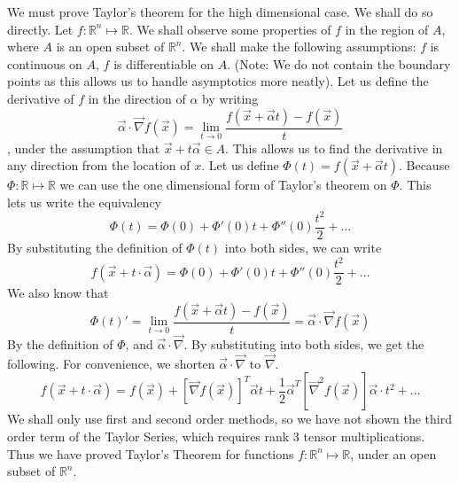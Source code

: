 \documentclass[10pt]{article}
\begin{document}
We must prove Taylor's theorem for the high dimensional case. We shall do so directly.
Let $f : \mathbb{R}^n \mapsto \mathbb{R}$. We shall observe some properties of $f$ in the region of $A$, where $A$ is an open subset of $\mathbb{R}^n$. We shall make the following assumptions: $f$ is continuous on $A$, $f$ is differentiable on $A$. (Note: We do not contain the boundary points as this allows us to handle asymptotics more neatly). 
Let us define the derivative of $f$ in the direction of $\alpha$ by writing \begin{equation}\vec{\alpha} \cdot \vec{\nabla} f(\vec{x}) = \lim_{t \to 0}\frac{f(\vec{x} + \vec{\alpha}t) - f(\vec{x})}{t}\end{equation}, under the assumption that $\vec{x} + t \vec{\alpha} \in A$. This allows us to find the derivative in any direction from the location of $x$. Let us define $\Phi(t) = f(\vec{x} + \vec{\alpha} t)$. Because $\Phi : \mathbb{R} \mapsto \mathbb{R}$
we can use the one dimensional form of Taylor's theorem \cite{wikipediacontributors-2019-taylor}on $\Phi$. This lets us write the equivalency 
\begin{equation}\Phi(t) = \Phi(0) + \Phi'(0)t + \Phi''(0)\frac{t^2}{2} + \dots\end{equation}
By substituting the definition of $\Phi(t)$ into both sides, we can write 
\begin{equation} f(\vec{x} + t \cdot \vec{\alpha}) = \Phi(0) + \Phi'(0)t + \Phi''(0)\frac{t^2}{2} + \dots\end{equation}
We also know that 
\begin{equation}\Phi(t)' = \lim_{t \to 0}\frac{f(\vec{x} + \vec{\alpha}t) - f(\vec{x})}{t} = \vec{\alpha} \cdot \vec{\nabla}f(\vec{x})\end{equation}
By the definition of $\Phi$, and $\vec{\alpha} \cdot \vec{\nabla}$.
By substituting into both sides, we get the following. For convenience, we shorten $\vec{\alpha}\cdot\vec{\nabla}$ to $\vec{\nabla}$.
\begin{equation} f(\vec{x} + t \cdot \vec{\alpha}) = f(\vec{x}) + [\vec{\nabla}f(\vec{x})]^T\vec{\alpha} t + \frac{1}{2}\vec{\alpha}^T[\vec{\nabla}^2f(\vec{x})]\vec{\alpha} \cdot t^2 + \dots\end{equation}
We shall only use first and second order methods, so we have not shown the third order term of the Taylor Series, which requires rank 3 tensor multiplications.
Thus we have proved Taylor's Theorem for functions $f : \mathbb{R}^n \mapsto \mathbb{R}$, under an open subset of $\mathbb{R}^n$.
\end{document}
